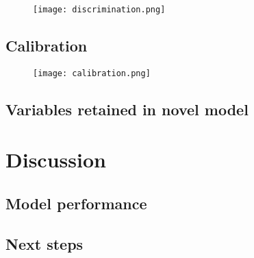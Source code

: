 \documentclass[onecolumn]{article}
\begin{document}

\begin{figure}
\centering
	\texttt{[image: discrimination.png]}
	\caption{}
	\label{DiscriminationFig}
\end{figure}


\subsection{Calibration}


\begin{figure}
\centering
	\texttt{[image: calibration.png]}
	\caption{}
	\label{CalibrationFig}
\end{figure}

\subsection{Variables retained in novel model}

\section{Discussion}

\subsection{Model performance}


\subsection{Next steps}


\begin{multicols}{2}

{\small
}

\end{multicols}
\end{document}
